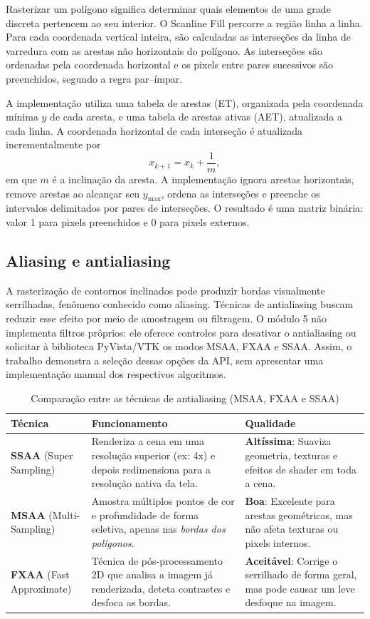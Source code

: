 Rasterizar um polígono significa determinar quais elementos de uma grade discreta pertencem ao seu interior. O Scanline Fill percorre a região linha a linha. Para cada coordenada vertical inteira, são calculadas as interseções da linha de varredura com as arestas não horizontais do polígono. As interseções são ordenadas pela coordenada horizontal e os pixels entre pares sucessivos são preenchidos, segundo a regra par--ímpar.

A implementação utiliza uma tabela de arestas (ET), organizada pela coordenada mínima $y$ de cada aresta, e uma tabela de arestas ativas (AET), atualizada a cada linha. A coordenada horizontal de cada interseção é atualizada incrementalmente por
\[
x_{k+1}=x_k+\frac{1}{m},
\]
em que $m$ é a inclinação da aresta. A implementação ignora arestas horizontais, remove arestas ao alcançar seu $y_{\max}$, ordena as interseções e preenche os intervalos delimitados por pares de interseções. O resultado é uma matriz binária: valor 1 para pixels preenchidos e 0 para pixels externos.

\subsection{Aliasing e antialiasing}

A rasterização de contornos inclinados pode produzir bordas visualmente serrilhadas, fenômeno conhecido como aliasing. Técnicas de antialiasing buscam reduzir esse efeito por meio de amostragem ou filtragem. O módulo 5 não implementa filtros próprios: ele oferece controles para desativar o antialiasing ou solicitar à biblioteca PyVista/VTK os modos MSAA, FXAA e SSAA. Assim, o trabalho demonstra a seleção dessas opções da API, sem apresentar uma implementação manual dos respectivos algoritmos.

\begin{table}[htbp]
\centering
\caption{Comparação entre as técnicas de antialiasing (MSAA, FXAA e SSAA)}
\label{tab:antialiasing}
\begin{tabular}{|l|p{5cm}|p{4.5cm}|}
\hline
\textbf{Técnica} & \textbf{Funcionamento} & \textbf{Qualidade}\\ \hline
\textbf{SSAA} \newline (Super Sampling) & Renderiza a cena em uma resolução superior (ex: 4x) e depois redimensiona para a resolução nativa da tela. & \textbf{Altíssima}: Suaviza geometria, texturas e efeitos de shader em toda a cena. \\ \hline
\textbf{MSAA} \newline (Multi-Sampling) & Amostra múltiplos pontos de cor e profundidade de forma seletiva, apenas nas \textit{bordas dos polígonos}. & \textbf{Boa}: Excelente para arestas geométricas, mas não afeta texturas ou pixels internos. \\ \hline
\textbf{FXAA} \newline (Fast Approximate) & Técnica de pós-processamento 2D que analisa a imagem já renderizada, deteta contrastes e desfoca as bordas. & \textbf{Aceitável}: Corrige o serrilhado de forma geral, mas pode causar um leve desfoque na imagem. \\ \hline
\end{tabular}
\end{table}


